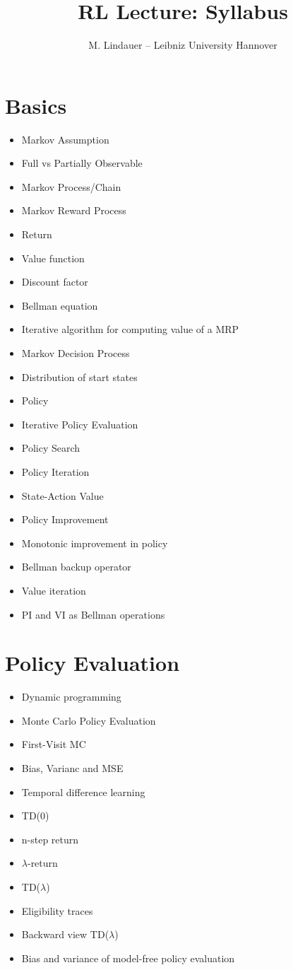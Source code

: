 \documentclass[]{article}
\title{RL Lecture: Syllabus}
\author{M. Lindauer -- Leibniz University Hannover}
\date{}
\begin{document}
\maketitle

\section{Basics}

\begin{itemize}
\itemsep-0.5em
    \item Markov Assumption
    \item Full vs Partially Observable
    \item Markov Process/Chain
    \item Markov Reward Process
    \item Return
    \item Value function
    \item Discount factor
    \item Bellman equation
    \item Iterative algorithm for computing value of a MRP
    \item Markov Decision Process
    \item Distribution of start states
    \item Policy
    \item Iterative Policy Evaluation
    \item Policy Search
    \item Policy Iteration
    \item State-Action Value 
    \item Policy Improvement
    \item Monotonic improvement in policy
    \item Bellman backup operator
    \item Value iteration
    \item PI and VI as Bellman operations
\end{itemize}

\section{Policy Evaluation}

\begin{itemize}
\itemsep-0.5em
    \item Dynamic programming
    \item Monte Carlo Policy Evaluation
    \item First-Visit MC
    \item Bias, Varianc and MSE
    \item Temporal difference learning
    \item TD(0)
    \item n-step return
    \item $\lambda$-return
    \item TD($\lambda$)
    \item Eligibility traces
    \item Backward view TD($\lambda$)
    \item Bias and variance of model-free policy evaluation
\end{itemize}
\end{document}
